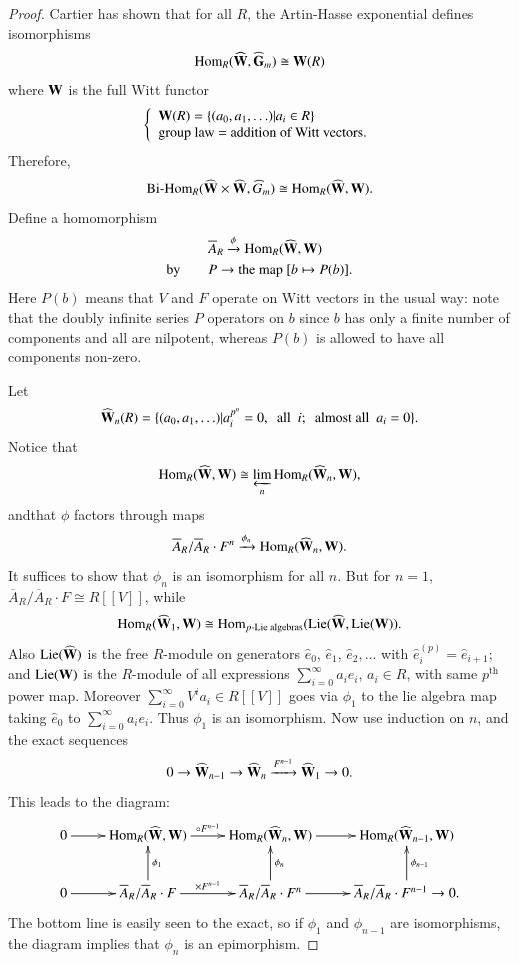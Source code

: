 \begin{proof}
Cartier \cite{art15-key1} has shown that for all $R$, the Artin-Hasse exponential defines isomorphisms
$$
\operatorname{\mathrm{Hom}}_{R}(\widehat{\mathbf{W}},\widehat{\mathbf{G}}_{m})\cong \mathbf{W}(R)
$$
where $\mathbf{W}$ is the full Witt functor
$$
\left\{
\begin{array}{l}
\mathbf{W}(R)=\{(a_{0},a_{1},\ldots)|a_{i}\in R\}\\
\text{group law = addition of Witt vectors.}
\end{array}
\right.
$$
Therefore,
$$
\text{\rm Bi-Hom}_{R}(\widehat{\mathbf{W}}\times \widehat{\mathbf{W}}, \widehat{G}_{m})\cong \operatorname{\mathrm{Hom}}_{R}(\widehat{\mathbf{W}},\mathbf{W}).
$$
Define a homomorphism
\begin{align*}
&\overline{A}_{R}\xrightarrow{\phi}\operatorname{\mathrm{Hom}}_{R}(\widehat{\mathbf{W}},\mathbf{W})\\
\text{by}\qquad & P\to \text{the map } [b\mapsto P(b)].
\end{align*}
Here $P(b)$ means that $V$ and $F$ operate on Witt vectors in the usual way: note that the doubly infinite series $P$ operators on $b$ since $b$ has only a finite number of components and all are nilpotent, whereas $P(b)$ is allowed to have all components non-zero.

Let
$$
\widehat{\mathbf{W}}_{n}(R)=\{(a_{0},a_{1},\ldots)|a^{p^{n}}_{i}=0,\text{~ all~ } i;\text{~ almost all~ } a_{i}=0\}.
$$
Notice that
$$
\operatorname{\mathrm{Hom}}_{R}(\widehat{\mathbf{W}},\mathbf{W})\cong \varprojlim_{n}\operatorname{\mathrm{Hom}}_{R}(\widehat{\mathbf{W}}_{n},\mathbf{W}),
$$
and\pageoriginale that $\phi$ factors through maps
$$
\overline{A}_{R}/\overline{A}_{R}\cdot F^{n}\xrightarrow{\phi_{n}}\operatorname{\mathrm{Hom}}_{R}(\widehat{\mathbf{W}}_{n},\mathbf{W}).
$$
It suffices to show that $\phi_{n}$ is an isomorphism for all $n$. But for $n=1$, $\overline{A}_{R}/\overline{A}_{R}\cdot F\cong R[[V]]$, while
$$
\operatorname{\mathrm{Hom}}_{R}(\widehat{\mathbf{W}}_{1},\mathbf{W})\cong \operatorname{\mathrm{Hom}}_{p\text{-Lie algebras}}(\operatorname{\mathrm{Lie}} (\widehat{\mathbf{W}},\operatorname{\mathrm{Lie}}(\mathbf{W})).
$$
Also $\operatorname{\mathrm{Lie}}(\widehat{\mathbf{W}})$ is the free $R$-module on generators $\widehat{e}_{0}$, $\widehat{e}_{1}$, $\widehat{e}_{2},\ldots$ with $\widehat{e}_{i}^{(p)}=\widehat{e}_{i+1}$; and $\operatorname{\mathrm{Lie}}(\mathbf{W})$ is the $R$-module of all expressions $\sum\limits^{\infty}_{i=0}a_{i}e_{i}$, $a_{i}\in R$, with same $p^{\text{th}}$ power map. Moreover $\sum\limits^{\infty}_{i=0} V^{i}a_{i}\in R[[V]]$ goes via $\phi_{1}$ to the lie algebra map taking $\widehat{e}_{0}$ to $\sum\limits^{\infty}_{i=0}a_{i}e_{i}$. Thus $\phi_{1}$ is an isomorphism. Now use induction on $n$, and the exact sequences 
$$
0\to \widehat{\mathbf{W}}_{n-1}\to \widehat{\mathbf{W}}_{n}\xrightarrow{F^{n-1}}\widehat{\mathbf{W}}_{1}\to 0.
$$
This leads to the diagram:
\[
\xymatrix{
0\ar[r] & \Hom_{R}(\widehat{\bfW},\bfW)\ar[r]^-{\circ F^{n-1}} & \Hom_{R}(\widehat{\bfW}_{n},\bfW)\ar[r] & \Hom_{R}(\widehat{\bfW}_{n-1},\bfW)\\
0\ar[r] & \overline{A}_{R}/\overline{A}_{R}\cdot F\ar[r]^-{\times F^{n-1}}\ar[u]_-{\phi_{1}} & \overline{A}_{R}/\overline{A}_{R}\cdot F^{n}\ar[u]_-{\phi_{n}}\ar[r] & \overline{A}_{R}/\overline{A}_{R}\cdot F^{n-1}\to 0.\ar[u]_-{\phi_{n-1}}  
}
\]
The bottom line is easily seen to the exact, so if $\phi_{1}$ and $\phi_{n-1}$ are isomorphisms, the diagram implies that $\phi_{n}$ is an epimorphism.
\end{proof}

